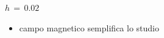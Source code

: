 \begin{frame}
\begin{columns}
\begin{column}{0.5\textwidth}
\begin{block}{$h\,=\,0.02$}
                \vspace{0.5cm}
                \begin{itemize}[itemsep=0.5em, label=$\diamond$]
                    \item campo magnetico semplifica lo studio
                \end{itemize}
            
            \end{block}
        \end{column}
    \end{columns}

\end{frame}